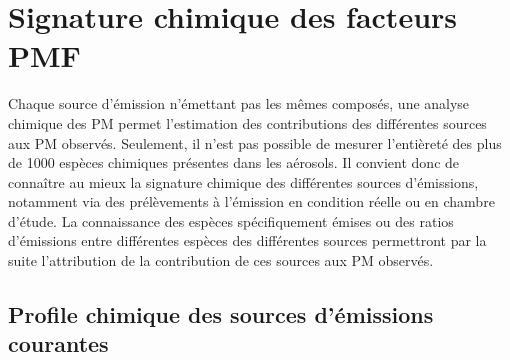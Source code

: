 \section{Signature chimique des facteurs PMF}%
\label{sec:signature_chimique_des_facteurs_PMF}

Chaque source d'émission n'émettant pas les mêmes composés, une analyse chimique
des PM permet l'estimation des contributions des différentes sources aux PM observés.
Seulement, il n'est pas possible de mesurer l'entièreté des plus de 1000 espèces chimiques
présentes dans les aérosols.
Il convient donc de connaître au mieux la signature chimique des différentes sources
d'émissions, notamment via des prélèvements à l'émission en condition
réelle ou en chambre d'étude. La connaissance des espèces spécifiquement émises ou des
ratios d'émissions entre différentes espèces des différentes sources permettront par la
suite l'attribution de la contribution de ces sources aux PM observés.

\subsection{Profile chimique des sources d'émissions courantes}%
\label{sub:profile_chimique_des_sources_d_émissions_courantes}

